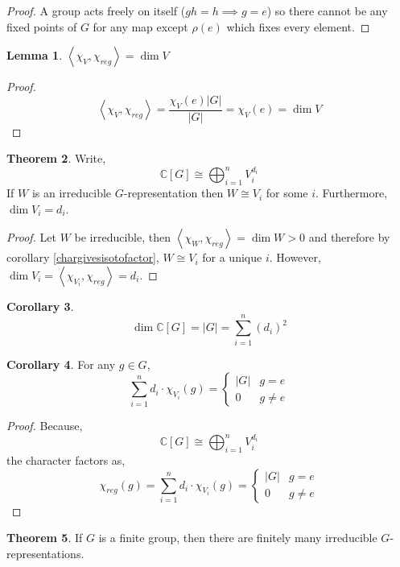 \documentclass[12pt]{extarticle}
\newcommand{\C}{\mathbb{C}}
\newcommand{\inner}[2]{\left<#1, #2 \right>}
\theoremstyle{definition}
\newtheorem{theorem}{Theorem}[section]
\newtheorem{lemma}[theorem]{Lemma}
\newtheorem{corollary}[theorem]{Corollary}
\begin{document}
\begin{proof}
A group acts freely on itself ($g h = h \implies g = e$) so there cannot be any fixed points of $G$ for any map except $\rho(e)$ which fixes every element. 
\end{proof}

\begin{lemma}
$\inner{\chi_V}{\chi_{reg}} = \dim{V}$
\end{lemma}
\begin{proof}
\[\inner{\chi_V}{\chi_{reg}} = \frac{\chi_V(e) |G|}{|G|} = \chi_V(e)=  \dim{V}\]
\end{proof}

\begin{theorem}
Write, 
\[\C[G] \cong \bigoplus_{i = 1}^n V_i^{d_i}\]
If $W$ is an irreducible $G$-representation then $W \cong V_i$ for some $i$. Furthermore, $\dim{V_i} = d_i$. 
\end{theorem}

\begin{proof}
Let $W$ be irreducible, then $\inner{\chi_W}{\chi_{reg}} = \dim{W} > 0$ and therefore by corollary \ref{chargivesisotofactor}, $W \cong V_i$ for a unique $i$. However, $\dim{V_i} = \inner{\chi_{V_i}}{ \chi_{reg}} = d_i$.
\end{proof}

\begin{corollary}
\[ \dim{\C[G]} = |G| = \sum_{i = 1}^n (d_i)^2 \]
\end{corollary}


\begin{corollary}
For any $g \in G$,
\[ \sum_{i = 1}^n d_i \cdot \chi_{V_i}(g) = \begin{cases}
|G| & g = e\\
0 & g \neq e
\end{cases} \]
\end{corollary}

\begin{proof}
Because,
\[\C[G] \cong \bigoplus_{i = 1}^n V_i^{d_i}\]
the character factors as,
\[\chi_{reg}(g) = \sum_{i = 1}^n d_i \cdot \chi_{V_i}(g) = \begin{cases}
|G| & g = e\\
0 & g \neq e
\end{cases} \]
\end{proof}

\begin{theorem}
If $G$ is a finite group, then there are finitely many irreducible $G$-representations.
\end{theorem}
\end{document}

